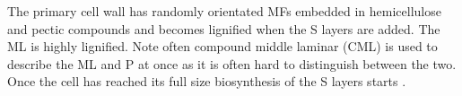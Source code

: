 The primary cell wall has randomly orientated MFs embedded
in hemicellulose and pectic compounds and becomes lignified when the S layers are added.
The ML is highly lignified. Note often compound middle laminar (CML) is used to describe
the ML and P at once as it is often hard to distinguish between the two. Once the cell has reached its
full size biosynthesis of the S layers starts \cite{fromm2013cellular}.